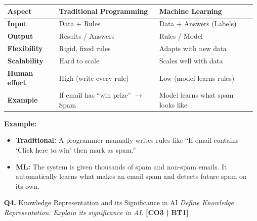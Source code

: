 \documentclass[12pt,a4paper]{article}
\newcommand{\Qno}[1]{\textbf{\color{darkred}Q#1.}}
\newcommand{\term}[1]{\textbf{\color{headingcolor}#1}}
\begin{document}
\begin{answerenv}
\begin{center}
\begin{tabular}{>{\bfseries\small}p{3.5cm} p{4.5cm} p{4.5cm}}
\toprule
\textbf{Aspect} & \textbf{Traditional Programming} & \textbf{Machine Learning} \\
\midrule
Input & Data + Rules & Data + Answers (Labels) \\
Output & Results / Answers & Rules / Model \\
Flexibility & Rigid, fixed rules & Adapts with new data \\
Scalability & Hard to scale & Scales well with data \\
Human effort & High (write every rule) & Low (model learns rules) \\
Example & If email has ``win prize'' $\to$ Spam & Model learns what spam looks like \\
\bottomrule
\end{tabular}
\end{center}

\vspace{4pt}
\textbf{\color{headingcolor}Example:}
\begin{itemize}[leftmargin=1.5em]
  \item \term{Traditional:} A programmer manually writes rules like ``If email contains `Click here to win' then mark as spam.''
  \item \term{ML:} The system is given thousands of spam and non-spam emails. It automatically learns what makes an email spam and detects future spam on its own.
\end{itemize}

\end{answerenv}

\vspace{8pt}

\begin{questionbox}{\Qno{4} Knowledge Representation and its Significance in AI}
\textit{Define Knowledge Representation. Explain its significance in AI.} \hfill \textbf{[CO3 | BT1]}
\end{questionbox}
\end{document}
